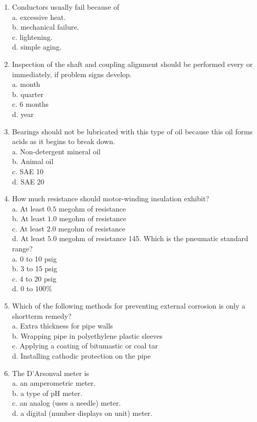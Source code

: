 \documentclass[10pt]{article}
\begin{document}
\begin{enumerate}
  \item Conductors usually fail because of\\
a. excessive heat.\\
b. mechanical failure.\\
c. lightening.\\
d. simple aging.

  \item Inspection of the shaft and coupling alignment should be performed every or immediately, if problem signs develop.\\
a. month\\
b. quarter\\
c. 6 months\\
d. year

  \item Bearings should not be lubricated with this type of oil because this oil forms acids as it begins to break down.\\
a. Non-detergent mineral oil\\
b. Animal oil\\
c. SAE 10\\
d. SAE 20

  \item How much resistance should motor-winding insulation exhibit?\\
a. At least $0.5$ megohm of resistance\\
b. At least $1.0$ megohm of resistance\\
c. At least $2.0$ megohm of resistance\\
d. At least $5.0$ megohm of resistance 145. Which is the pneumatic standard range?\\
a. 0 to 10 psig\\
b. 3 to 15 psig\\
c. 4 to 20 psig\\
d. 0 to $100 \%$

  \item Which of the following methods for preventing external corrosion is only a shortterm remedy?\\
a. Extra thickness for pipe walls\\
b. Wrapping pipe in polyethylene plastic sleeves\\
c. Applying a coating of bitumastic or coal tar\\
d. Installing cathodic protection on the pipe

  \item The D'Arsonval meter is\\
a. an amperometric meter.\\
b. a type of $\mathrm{pH}$ meter.\\
c. an analog (uses a needle) meter.\\
d. a digital (number displays on unit) meter.


\end{enumerate}
\end{document}
